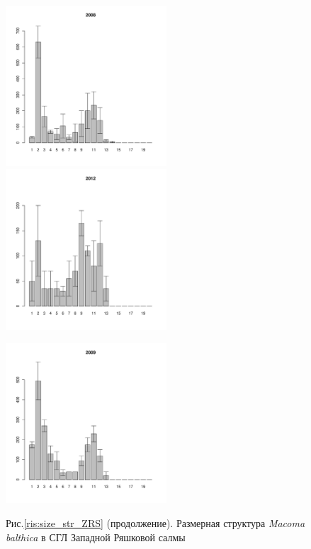 \documentclass[12pt, a4paper]{article}
\begin{document}
\begin{figure}[h]
\begin{multicols}{3}
\end{multicols}


\begin{multicols}{3}
\hfill
\includegraphics[width=60mm]{../White_Sea/Ryashkov_ZRS/zrs_2008_.pdf}
\hfill
\includegraphics[width=60mm]{../White_Sea/Ryashkov_ZRS/zrs_2012_.pdf}
\hfill

\end{multicols}


\begin{multicols}{3}
\hfill
\includegraphics[width=60mm]{../White_Sea/Ryashkov_ZRS/zrs_2009_.pdf}
\hfill

\end{multicols}


\begin{center}
Рис.\ref{ris:size_str_ZRS} (продолжение). Размерная структура {\it Macoma balthica} в СГЛ Западной Ряшковой салмы
\end{center}
\end{figure}
\end{document}
